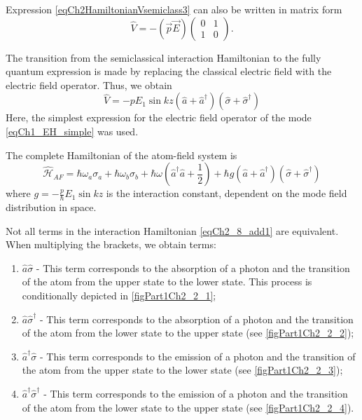 Expression \eqref{eqCh2HamiltonianVsemiclass3} can also
be written in matrix form 
\begin{equation}
\hat{V} = - \left(\vec{p} \vec{E}\right)
\left(
\begin{array} {cc}
0 & 1  
\\
1 & 0 
\end{array}
\right).
\label{eqCh2_8}
\end{equation}

The transition from the semiclassical interaction Hamiltonian to the fully
quantum expression is made by replacing the classical
electric field with the electric field operator. Thus, we obtain 
\begin{equation}
\hat{V} = - p E_1 \sin k z \left(\hat{a} + \hat{a}^{\dag}\right)
\left(\hat{\sigma} + \hat{\sigma}^{\dag}\right)
\label{eqCh2_8_add1}
\end{equation}
Here, the simplest expression for the electric field
operator of the mode \eqref{eqCh1_EH_simple} was used. 

The complete Hamiltonian of the atom-field system is
\begin{equation}
\hat{\mathcal{H}}_{AF} = 
\hbar \omega_a \sigma_a + \hbar \omega_b \sigma_b +
\hbar \omega 
\left(\hat{a}^{\dag}\hat{a} + \frac{1}{2}\right)
+ \hbar g \left(\hat{a} + \hat{a}^{\dag}\right)
\left(\hat{\sigma} + \hat{\sigma}^{\dag}\right)
\nonumber
\end{equation}
where $g = -\frac{p}{\hbar}E_1 \sin k z$ is the interaction constant,
dependent on the mode field distribution in space.  









Not all terms in the interaction Hamiltonian
\eqref{eqCh2_8_add1} are equivalent. When multiplying the brackets, we obtain
terms: 
\begin{enumerate}
\item $\hat{a}\hat{\sigma}$ - This term corresponds to the absorption
  of a photon and the transition of the atom from the upper state to the lower state. This
  process is conditionally depicted in \autoref{figPart1Ch2_2_1};  
\item $\hat{a}\hat{\sigma}^{\dag}$ - This term corresponds to the absorption
  of a photon and the transition of the atom from the lower state to the upper state (see \autoref{figPart1Ch2_2_2});  
\item $\hat{a}^{\dag}\hat{\sigma}$ - This term corresponds to the emission
  of a photon and the transition of the atom from the upper state to the lower state (see \autoref{figPart1Ch2_2_3}); 
\item $\hat{a}^{\dag}\hat{\sigma}^{\dag}$ - This term corresponds
  to the emission of a photon and the transition of the atom from the lower state to the upper state (see \autoref{figPart1Ch2_2_4}). 
\end{enumerate}

